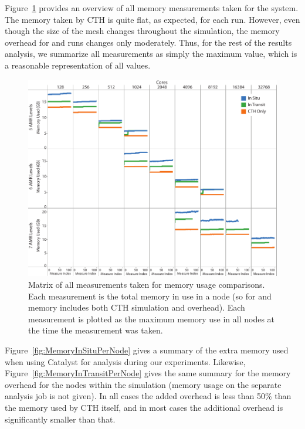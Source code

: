 Figure~\ref{fig:MemoryUsageAll} provides an overview of all memory
measurements taken for the system.  The memory taken by CTH is quite flat,
as expected, for each run.  However, even though the size of the mesh
changes throughout the simulation, the memory overhead for \insitu and
\intransit runs changes only moderately.  Thus, for the rest of the results
analysis, we summarize all measurements as simply the maximum value, which
is a reasonable representation of all values.

\begin{figure}[htb]
  \centering
  \includegraphics[width=\linewidth]{figures/MemoryUsageAll}
  \caption{Matrix of all measurements taken for memory usage comparisons.
    Each measurement is the total memory in use in a node (so for \insitu and
    \intransit memory includes both CTH simulation and overhead).  Each
    measurement is plotted as the maximum memory use in all nodes at the
    time the measurement was taken.}
  \label{fig:MemoryUsageAll}
\end{figure}

Figure~\ref{fig:MemoryInSituPerNode} gives a summary of the extra memory
used when using Catalyst for \insitu analysis during our experiments.
Likewise, Figure~\ref{fig:MemoryInTransitPerNode} gives the same summary
for the \intransit memory overhead for the nodes within the simulation
(memory usage on the separate analysis job is not given).  In all cases the
added overhead is less than 50\% than the memory used by CTH itself, and in
most cases the additional overhead is significantly smaller than that.

